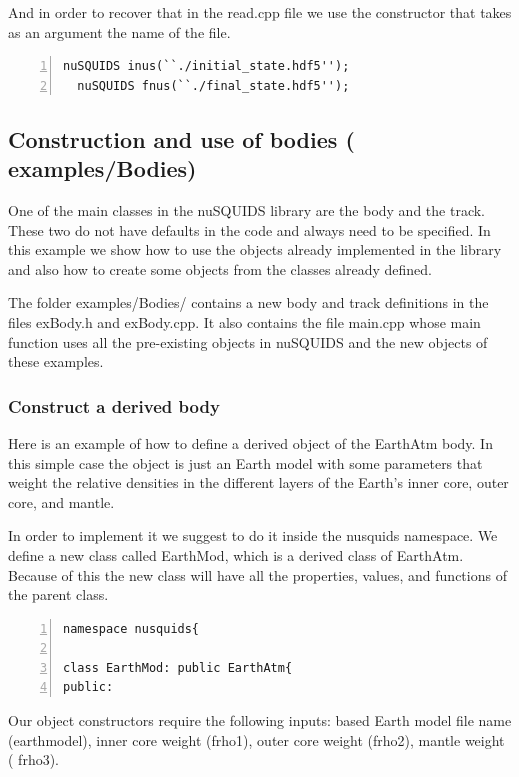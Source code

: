 \documentclass[3p,12pt]{elsarticle}
\newcommand{\ttf}{\ttfamily}
\begin{document}
And in order to recover that in the {\ttf read.cpp} file we use the
constructor that takes as an argument the name of the file.

\begin{lstlisting}[frame=leftline, numbers =
  left,breaklines=true,label = ex:sin1]
  nuSQUIDS inus(``./initial_state.hdf5'');
  nuSQUIDS fnus(``./final_state.hdf5''); 
\end{lstlisting}


\subsection{Construction and use of bodies \textnormal{({\ttf
      examples/Bodies})}}
\label{sec:body}
One of the main classes in the nuSQUIDS library are the body and the
track. These two do not have defaults in the code and always need to
be specified.
In this example we show how to use the objects already implemented in
the library and also how to create some objects from the classes
already defined.

The folder {\ttf examples/Bodies/} contains a new body and track
definitions in the files {\ttf exBody.h} and {\ttf exBody.cpp}.
It also contains the file {\ttf main.cpp} whose main function 
uses all the pre-existing objects in nuSQUIDS and the new objects
of these examples.


\subsubsection{Construct a derived body}

Here is an example of how to define a derived object of the EarthAtm
body. In this simple case the object is just an Earth model with some
parameters that weight the relative densities in the different layers
of the Earth's inner core, outer core, and mantle.

In order to implement it we suggest to do it inside the {\ttf nusquids}
namespace. We define a new class called {\ttf EarthMod}, which is a derived class of {\ttf
  EarthAtm}. Because of this the new class will have all the properties,
values, and functions of the parent class. 
\begin{lstlisting}[frame=leftline, numbers = left,breaklines=true,label = ex:sin1]
namespace nusquids{

class EarthMod: public EarthAtm{
public:
\end{lstlisting}

Our object constructors require the following inputs:
based Earth model file name ({\ttf earthmodel}), inner core weight
({\ttf frho1}), outer core weight ({\ttf frho2}), mantle weight ({\ttf
  frho3}).
\end{document}
